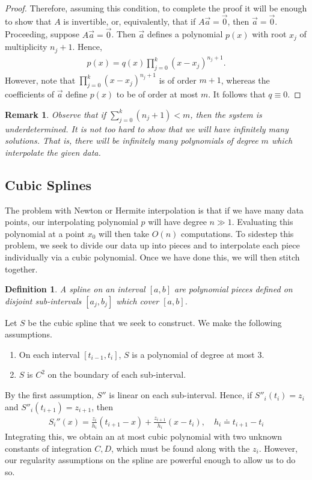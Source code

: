 \documentclass[12pt,reqno]{amsart}
\numberwithin{equation}{section}  %
\newtheorem{definition}[theorem]{Definition}
\newtheorem{remark}[theorem]{Remark}
\begin{document}
\begin{proof}
Therefore, assuming this condition, to complete
the proof it will be enough to show that $A$ is invertible, or, equivalently,
that if $A \vec{a}=\vec{0}$, then $\vec{a} = \vec{0}$. Proceeding, suppose
$A \vec{a}=\vec{0}$. Then $\vec{a}$ defines a polynomial $p(x)$ with root $x_j$ of
multiplicity $n_j +1$. Hence,
\begin{equation*}
\begin{split}
p(x) = q(x) \prod_{j=0}^{k}(x-x_{j})^{n_{j}+1}.
\end{split}
\end{equation*}
However, note that $\prod_{j=0}^{k}(x-x_{j})^{n_{j}+1}$ is of order $m+1$,
whereas the coefficients of $\vec{a}$ define $p(x)$ to be of order at most $m$.
It follows that $q \equiv 0$. 
\end{proof}
\begin{remark}
Observe that if $\sum_{j=0}^{k}(n_j + 1) < m$, then the system is underdetermined.
It is not too hard to show that we will have infinitely many solutions. That is, there will be infinitely
many polynomials of degree $m$ which interpolate the given data.
\end{remark}
\subsection{Cubic Splines}
The problem with Newton or Hermite interpolation is that if we have
many data points, our interpolating polynomial $p$ will have degree $n \gg 1$.
Evaluating this polynomial at a point $x_0$ will then take $O(n)$ computations.
To sidestep this problem, we seek to divide our data up into pieces
and to interpolate each piece individually via a cubic polynomial.
Once we have done this, we will then stitch together.
\begin{definition}
A spline on an interval $[a,b]$ are polynomial pieces defined on 
disjoint sub-intervals $[a_j,b_j]$ which cover $[a,b]$. 
\end{definition}
Let $S$ be the cubic spline that we seek to construct. We make
the following assumptions.
\begin{enumerate}
\item On each interval $[t_{i-1}, t_i]$, $S$ is a polynomial of degree
at most $3$.
\item $S$ is $C^2$ on the boundary of each sub-interval.
\end{enumerate}
By the first assumption, $S''$ is linear on each sub-interval.
Hence, if $S''_i(t_i) = z_i$ and $S''_{i}(t_{i+1}) = z_{i+1}$,
then
\begin{align*}
S_{i}''(x) = \frac{z_i}{h_i}(t_{i+1} - x) + \frac{z_{i+1}}{h_i}(x- t_i),
\quad h_i \doteq
t_{i+1}- t_i	
\end{align*}
Integrating this, we obtain an at most cubic polynomial with  two unknown
constants of integration $C, D$, which must be found along with the $z_i$.
However, our regularity assumptions on the spline are powerful enough to allow
us to do so.
\end{document}
